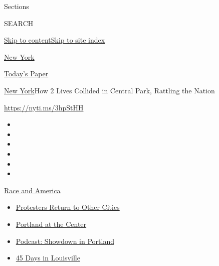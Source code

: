 Sections

SEARCH

\protect\hyperlink{site-content}{Skip to
content}\protect\hyperlink{site-index}{Skip to site index}

\href{https://www.nytimes3xbfgragh.onion/section/nyregion}{New York}

\href{https://myaccount.nytimes3xbfgragh.onion/auth/login?response_type=cookie\&client_id=vi}{}

\href{https://www.nytimes3xbfgragh.onion/section/todayspaper}{Today's
Paper}

\href{/section/nyregion}{New York}\textbar{}How 2 Lives Collided in
Central Park, Rattling the Nation

\href{https://nyti.ms/3hpStHH}{https://nyti.ms/3hpStHH}

\begin{itemize}
\item
\item
\item
\item
\item
\item
\end{itemize}

\href{https://www.nytimes3xbfgragh.onion/news-event/george-floyd-protests-minneapolis-new-york-los-angeles?action=click\&pgtype=Article\&state=default\&region=TOP_BANNER\&context=storylines_menu}{Race
and America}

\begin{itemize}
\tightlist
\item
  \href{https://www.nytimes3xbfgragh.onion/2020/07/26/us/protests-portland-seattle-trump.html?action=click\&pgtype=Article\&state=default\&region=TOP_BANNER\&context=storylines_menu}{Protesters
  Return to Other Cities}
\item
  \href{https://www.nytimes3xbfgragh.onion/2020/07/24/us/portland-oregon-protests-white-race.html?action=click\&pgtype=Article\&state=default\&region=TOP_BANNER\&context=storylines_menu}{Portland
  at the Center}
\item
  \href{https://www.nytimes3xbfgragh.onion/2020/07/23/podcasts/the-daily/portland-protests.html?action=click\&pgtype=Article\&state=default\&region=TOP_BANNER\&context=storylines_menu}{Podcast:
  Showdown in Portland}
\item
  \href{https://www.nytimes3xbfgragh.onion/interactive/2020/07/16/us/black-lives-matter-protests-louisville-breonna-taylor.html?action=click\&pgtype=Article\&state=default\&region=TOP_BANNER\&context=storylines_menu}{45
  Days in Louisville}
\end{itemize}

